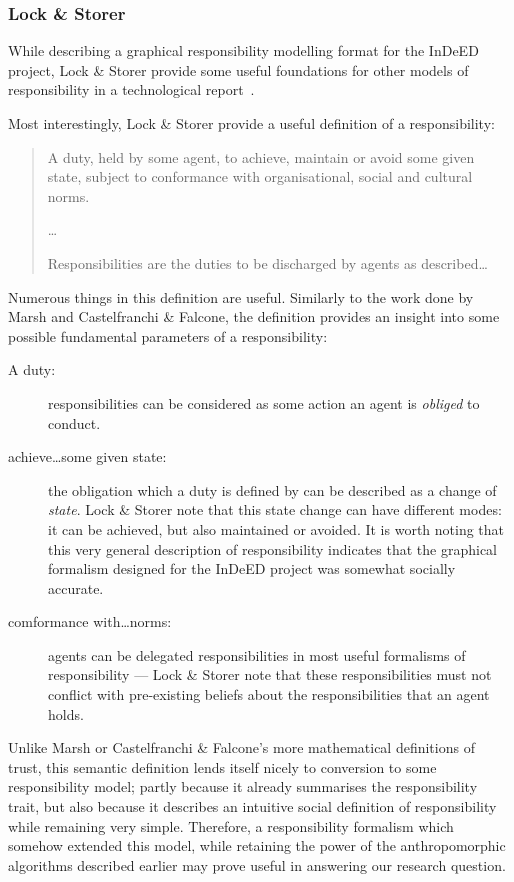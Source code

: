 \subsubsection{Lock \& Storer\cite{storer2008modelling}}
While describing a graphical responsibility modelling format for the InDeED project, Lock \& Storer provide some useful foundations for other models of responsibility in a technological report\cite{storer2008modelling}~.\par

Most interestingly, Lock \& Storer provide a useful definition of a responsibility:

\begin{quotation}
    A duty, held by some agent, to achieve, maintain or avoid some given state, subject to conformance with organisational, social and cultural norms.\cite{storer2008modelling}\par
    
    \ldots{}\par
    
    Responsibilities are the duties to be discharged by agents as described\ldots{}
\end{quotation}

Numerous things in this definition are useful. Similarly to the work done by Marsh and Castelfranchi \& Falcone, the definition provides an insight into some possible fundamental parameters of a responsibility:

\begin{description}
    \item [A duty: ] responsibilities can be considered as some action an agent is \emph{obliged} to conduct.
    \item [achieve\ldots{}some given state: ] the obligation which a duty is defined by can be described as a change of \emph{state}. Lock \& Storer note that this state change can have different modes: it can be achieved, but also maintained or avoided. It is worth noting that this very general description of responsibility indicates that the graphical formalism designed for the InDeED project was somewhat socially accurate.
    \item [comformance with\ldots{}norms: ] agents can be delegated responsibilities in most useful formalisms of responsibility --- Lock \& Storer note that these responsibilities must not conflict with pre-existing beliefs about the responsibilities that an agent holds.
\end{description}

Unlike Marsh or Castelfranchi \& Falcone's more mathematical definitions of trust, this semantic definition lends itself nicely to conversion to some responsibility model; partly because it already summarises the responsibility trait, but also because it describes an intuitive social definition of responsibility while remaining very simple. Therefore, a responsibility formalism which somehow extended this model, while retaining the power of the anthropomorphic algorithms described earlier may prove useful in answering our research question.\par

